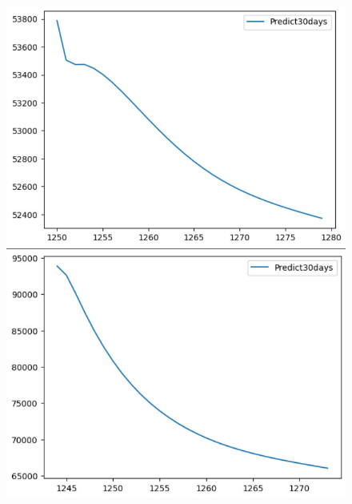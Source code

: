 \begin{figure}[H]
\begin{minipage}{0.15\textwidth}
    \centering
    \includegraphics[width=1\textwidth]{resources/chapter-5/predicted/BIDV_LSTM_9_1_next30days.jpg}
    \end{minipage}
    \hfill
    \begin{minipage}{0.15\textwidth}
    \centering
    \includegraphics[width=1\textwidth]{resources/chapter-5/predicted/VCB_LSTM_7_3_next30days.jpg}
    \end{minipage}
    \hfill
    \begin{minipage}{0.15\textwidth}
    \centering

\end{minipage}
\end{figure}
